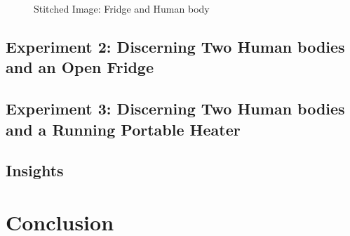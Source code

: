 \documentclass{sig-alternate}
\begin{document}
\begin{figure*}[!htp]
\begin{minipage}{0.01\textwidth}
\begin{center}
\end{center}
\end{minipage}
\begin{minipage}{1.2\textwidth}
\begin{center}
\end{center}
\end{minipage}
\caption{Stitched Image: Fridge and Human body}
\label{fig:Stitched}
\end{figure*}



\subsection{Experiment 2: Discerning Two Human bodies and an Open Fridge}
\subsection{Experiment 3: Discerning Two Human bodies and a Running Portable Heater}

\subsection{Insights}

\section{Conclusion}	
\end{document}
